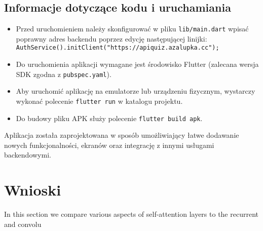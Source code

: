 \documentclass{article}
\begin{document}
		\subsection*{Informacje dotyczące kodu i uruchamiania}
			\begin{itemize}
				\item Przed uruchomieniem należy skonfigurować w pliku \texttt{lib/main.dart} wpisać poprawny adres backendu poprzez edycję następującej linijki: \\
				\texttt{AuthService().initClient("https://apiquiz.azalupka.cc");}
				\item Do uruchomienia aplikacji wymagane jest środowisko Flutter (zalecana wersja SDK zgodna z \texttt{pubspec.yaml}).
				\item Aby uruchomić aplikację na emulatorze lub urządzeniu fizycznym, wystarczy wykonać polecenie \texttt{flutter run} w katalogu projektu.
				\item Do budowy pliku APK służy polecenie \texttt{flutter build apk}.
			\end{itemize}

		Aplikacja została zaprojektowana w sposób umożliwiający łatwe dodawanie nowych funkcjonalności, ekranów oraz integrację z innymi usługami backendowymi.
	
	\section{Wnioski}
	In this section we compare various aspects of self-attention layers to the recurrent and convolu
	
	
\end{document}
